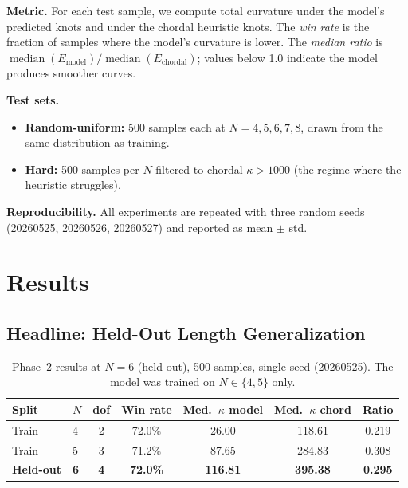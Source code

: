 \documentclass[11pt, a4paper]{article}
\begin{document}
\textbf{Metric.}
For each test sample, we compute total curvature under the model's
predicted knots and under the chordal heuristic knots. The
\emph{win rate} is the fraction of samples where the model's curvature
is lower. The \emph{median ratio} is
$\operatorname{median}(E_{\text{model}}) /
 \operatorname{median}(E_{\text{chordal}})$; values below 1.0 indicate
the model produces smoother curves.

\textbf{Test sets.}
\begin{itemize}
  \item \textbf{Random-uniform:} 500 samples each at $N = 4, 5, 6, 7, 8$,
        drawn from the same distribution as training.
  \item \textbf{Hard:} 500 samples per $N$ filtered to
        chordal $\kappa > 1000$ (the regime where the heuristic struggles).
\end{itemize}

\textbf{Reproducibility.}
All experiments are repeated with three random seeds
(20260525, 20260526, 20260527) and reported as mean $\pm$ std.


\section{Results}
\label{sec:results}


\subsection{Headline: Held-Out Length Generalization}

\begin{table}[t]
\centering
\caption{%
  Phase~2 results at $N = 6$ (held out), 500 samples, single seed
  (20260525). The model was trained on $N \in \{4, 5\}$ only.%
}
\label{tab:main}
\begin{tabular}{llccccc}
\toprule
\textbf{Split} & $N$ & \textbf{dof} &
  \textbf{Win rate} & \textbf{Med.\ $\kappa$ model} &
  \textbf{Med.\ $\kappa$ chord} & \textbf{Ratio} \\
\midrule
Train   & 4 & 2 & 72.0\% & 26.00  & 118.61 & 0.219 \\
Train   & 5 & 3 & 71.2\% & 87.65  & 284.83 & 0.308 \\
\textbf{Held-out} & \textbf{6} & \textbf{4} &
  \textbf{72.0\%} & \textbf{116.81} & \textbf{395.38} &
  \textbf{0.295} \\
\bottomrule
\end{tabular}
\end{table}
\end{document}

